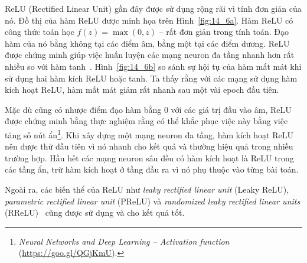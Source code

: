 ReLU (Rectified Linear Unit) gần đây được sử dụng rộng rãi vì tính đơn giản của
nó. Đồ thị của hàm ReLU được minh họa trên Hình~\ref{fig:14_6a}. Hàm ReLU có
công thức toán học $f(z) = \max(0, z)$ -- rất đơn giản trong tính toán.
Đạo hàm của nó bằng không tại các điểm âm, bằng một tại các điểm dương. ReLU được
chứng minh giúp việc huấn luyện các mạng neuron đa tầng nhanh hơn rất nhiều so với hàm
tanh~\cite{krizhevsky2012imagenet}. Hình~\ref{fig:14_6b} so sánh sự hội tụ của
hàm mất mát khi sử dụng hai hàm kích ReLU hoặc tanh. Ta thấy rằng với các mạng sử dụng hàm kích hoạt ReLU, hàm mất mát giảm rất nhanh sau một vài epoch đầu tiên. 



 

Mặc dù cũng có nhược điểm đạo hàm bằng 0 với các giá trị đầu vào âm, ReLU được
chứng minh bằng thực nghiệm rằng có thể khắc phục việc này bằng việc tăng số
nút ẩn\footnote{\textit{Neural Networks and Deep Learning  --  Activation
function} (\url{https://goo.gl/QGjKmU}).}. Khi xây dựng một mạng neuron đa tầng, hàm kích hoạt ReLU nên được thử đầu tiên vì nó nhanh cho kết quả và thường hiệu quả trong nhiều trường hợp. Hầu hết các mạng neuron sâu 
đều có hàm kích hoạt là ReLU trong các tầng ẩn, trừ hàm kích hoạt ở tầng đầu ra vì nó phụ thuộc vào từng bài toán. 

Ngoài ra, các biến thể của ReLU như \textit{leaky rectified linear unit} (Leaky
ReLU), \textit{parametric rectified linear unit} (PReLU) và \textit{randomized
leaky rectified linear units} (RReLU)~\cite{xu2015empirical} cũng được sử dụng
và cho kết quả tốt. 



